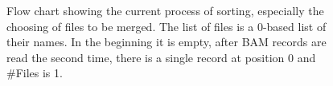 \begin{figure}
    \begin{adjustbox}{width=\linewidth}
        
    \end{adjustbox}
    \caption{Flow chart showing the current process of sorting, especially the choosing of files to be merged. The list of files is a 0-based list of their names. In the beginning it is empty, after BAM records are read the second time, there is a single record at position 0 and \#Files is 1.}
    \label{fig:flow}

\end{figure}